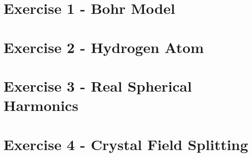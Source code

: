 








\section{Exercise 1 - Bohr Model}


\section{Exercise 2 - Hydrogen Atom}

\newpage
\section{Exercise 3 - Real Spherical Harmonics}


\section{Exercise 4 - Crystal Field Splitting}



